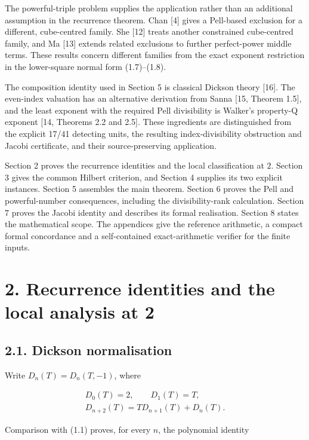 \documentclass[11pt,a4paper]{article}
\begin{document}
The powerful-triple problem supplies the application rather than an
additional assumption in the recurrence theorem. Chan {[}4{]} gives a
Pell-based exclusion for a different, cube-centred family. She {[}12{]}
treats another constrained cube-centred family, and Ma {[}13{]} extends
related exclusions to further perfect-power middle terms. These results
concern different families from the exact exponent restriction in the
lower-square normal form (1.7)--(1.8).

The composition identity used in Section 5 is classical Dickson theory
{[}16{]}. The even-index valuation has an alternative derivation from
Sanna {[}15, Theorem 1.5{]}, and the least exponent with the required
Pell divisibility is Walker's property-Q exponent {[}14, Theorems 2.2
and 2.5{]}. These ingredients are distinguished from the explicit 17/41
detecting units, the resulting index-divisibility obstruction and Jacobi
certificate, and their source-preserving application.

Section 2 proves the recurrence identities and the local classification
at \(2\). Section 3 gives the common Hilbert criterion, and Section 4
supplies its two explicit instances. Section 5 assembles the main
theorem. Section 6 proves the Pell and powerful-number consequences,
including the divisibility-rank calculation. Section 7 proves the Jacobi
identity and describes its formal realisation. Section 8 states the
mathematical scope. The appendices give the reference arithmetic, a
compact formal concordance and a self-contained exact-arithmetic
verifier for the finite inputs.

\section{2. Recurrence identities and the local analysis at
2}\label{recurrence}

\subsection{2.1. Dickson normalisation}\label{dickson}

Write \(D_n(T)=D_n(T,-1)\), where

\[
\begin{gathered}
D_0(T)=2,\qquad D_1(T)=T,\\
D_{n+2}(T)=TD_{n+1}(T)+D_n(T).
\end{gathered}
\tag{2.1}
\]

Comparison with (1.1) proves, for every \(n\), the polynomial identity
\end{document}
